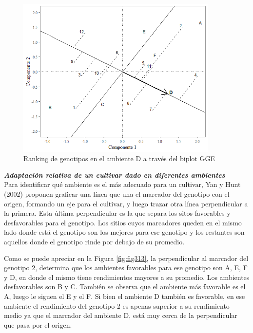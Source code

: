 \begin{figure}[h!]
	\begin{center}
		\includegraphics[width=10cm]{./Graficos/env_GGE.png}
	\end{center}
	\caption{Ranking de genotipos en el ambiente D a través del biplot GGE}
	\label{fig:fig312}
\end{figure}



\textbf{\emph{Adaptación relativa de un cultivar dado en diferentes ambientes}}\\

Para identificar qué ambiente es el más adecuado para un cultivar, Yan y Hunt (2002) proponen graficar una línea que una el marcador del genotipo con el origen, formando un eje para el cultivar, y luego trazar otra línea perpendicular a la primera. Esta última perpendicular es la que separa los sitos favorables y desfavorables para el genotipo. Los sitios cuyos marcadores queden en el mismo lado donde está el genotipo son los mejores para ese genotipo y los restantes son aquellos donde el genotipo rinde por debajo de su promedio.



Como se puede apreciar en la Figura \ref{fig:fig313}, la perpendicular al marcador del genotipo 2, determina que los ambientes favorables para ese genotipo son A, E, F y D, en donde el mismo tiene rendimientos mayores a su promedio. Los ambientes desfavorables son B y C.
También se observa que el ambiente más favorable es el A, luego le siguen el E y el F. Si bien el ambiente D también es favorable, en ese ambiente el rendimiento del genotipo 2 es apenas superior a su rendimiento medio ya que el marcador del ambiente D, está muy cerca de la perpendicular que pasa por el origen.

